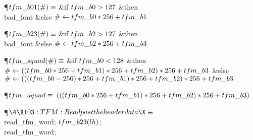 \Y\P\D {}$\\{tfm\_b01}(\#)\S$\6
\&{if} $\\{tfm\_b0}>127$ \1\&{then}\5
\\{bad\_font}\6
\4\&{else} $\#\K\\{tfm\_b0}\ast256+\\{tfm\_b1}$\2\par
\P\D {}$\\{tfm\_b23}(\#)\S$\6
\&{if} $\\{tfm\_b2}>127$ \1\&{then}\5
\\{bad\_font}\6
\4\&{else} $\#\K\\{tfm\_b2}\ast256+\\{tfm\_b3}$\2\par
\P\D {}$\\{tfm\_squad}(\#)\S$%
\6
\&{if} $\\{tfm\_b0}<128$ \1\&{then}\5
$\#\K((\\{tfm\_b0}\ast256+\\{tfm\_b1})\ast256+\\{tfm\_b2})\ast256+\\{tfm\_b3}$\6
\4\&{else} $\#\K(((\\{tfm\_b0}-256)\ast256+\\{tfm\_b1})\ast256+\\{tfm\_b2})%
\ast256+\\{tfm\_b3}$\2\par
\P\D {}$\\{tfm\_uquad}\S$\6
$(((\\{tfm\_b0}\ast256+\\{tfm\_b1})\ast256+\\{tfm\_b2})\ast256+\\{tfm\_b3})$\par
\Y\P$\4\X103:TFM: Read past the header data\X\S$\6
\\{read\_tfm\_word};\5
$\\{tfm\_b23}(\\{lh})$;\5
\\{read\_tfm\_word};\5
